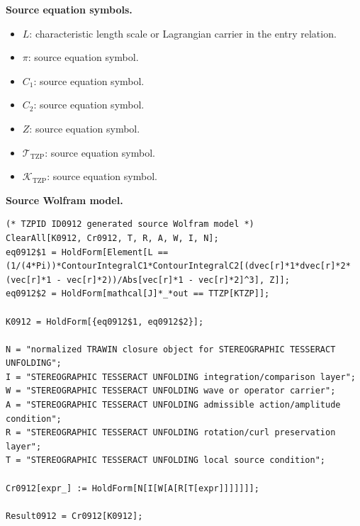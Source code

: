 \begin{minipage}[t]{0.49\linewidth}
\begingroup
\small
\raggedright
\textbf{Source equation symbols.}\par
\begin{itemize}[leftmargin=1.35em,itemsep=1pt,topsep=1pt,parsep=0pt]
    \item $L$: characteristic length scale or Lagrangian carrier in the entry relation.
    \item $\pi$: source equation symbol.
    \item $C_{1}$: source equation symbol.
    \item $C_{2}$: source equation symbol.
    \item $Z$: source equation symbol.
    \item $\mathcal{T}_{\mathrm{TZP}}$: source equation symbol.
    \item $\mathcal{K}_{\mathrm{TZP}}$: source equation symbol.
\end{itemize}
\endgroup
\end{minipage}\hfill
\begin{minipage}[t]{0.47\linewidth}
\begingroup
\scriptsize
\raggedright
\textbf{Source Wolfram model.}\par
\begin{Verbatim}[fontsize=\tiny,breaklines=true,breakanywhere=true]
(* TZPID ID0912 generated source Wolfram model *)
ClearAll[K0912, Cr0912, T, R, A, W, I, N];
eq0912$1 = HoldForm[Element[L == (1/(4*Pi))*ContourIntegralC1*ContourIntegralC2[(dvec[r]*1*dvec[r]*2*(vec[r]*1 - vec[r]*2))/Abs[vec[r]*1 - vec[r]*2]^3], Z]];
eq0912$2 = HoldForm[mathcal[J]*_*out == TTZP[KTZP]];

K0912 = HoldForm[{eq0912$1, eq0912$2}];

N = "normalized TRAWIN closure object for STEREOGRAPHIC TESSERACT UNFOLDING";
I = "STEREOGRAPHIC TESSERACT UNFOLDING integration/comparison layer";
W = "STEREOGRAPHIC TESSERACT UNFOLDING wave or operator carrier";
A = "STEREOGRAPHIC TESSERACT UNFOLDING admissible action/amplitude condition";
R = "STEREOGRAPHIC TESSERACT UNFOLDING rotation/curl preservation layer";
T = "STEREOGRAPHIC TESSERACT UNFOLDING local source condition";

Cr0912[expr_] := HoldForm[N[I[W[A[R[T[expr]]]]]]];

Result0912 = Cr0912[K0912];
\end{Verbatim}
\endgroup
\end{minipage}

